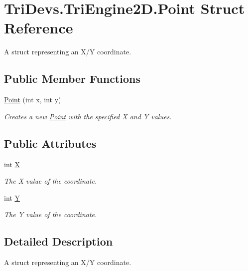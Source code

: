\hypertarget{struct_tri_devs_1_1_tri_engine2_d_1_1_point}{\section{Tri\-Devs.\-Tri\-Engine2\-D.\-Point Struct Reference}
\label{struct_tri_devs_1_1_tri_engine2_d_1_1_point}
}


A struct representing an X/\-Y coordinate.  


\subsection*{Public Member Functions}
\begin{DoxyCompactItemize}
\item 
\hyperlink{struct_tri_devs_1_1_tri_engine2_d_1_1_point_a3a3b2bb08d3698eb76adf458a465663a}{Point} (int x, int y)
\begin{DoxyCompactList}\small\item\em Creates a new \hyperlink{struct_tri_devs_1_1_tri_engine2_d_1_1_point}{Point} with the specified X and Y values. \end{DoxyCompactList}\end{DoxyCompactItemize}
\subsection*{Public Attributes}
\begin{DoxyCompactItemize}
\item 
int \hyperlink{struct_tri_devs_1_1_tri_engine2_d_1_1_point_a2dff6251e20a09f888596f31de981ffa}{X}
\begin{DoxyCompactList}\small\item\em The X value of the coordinate. \end{DoxyCompactList}\item 
int \hyperlink{struct_tri_devs_1_1_tri_engine2_d_1_1_point_ad750e91b0dbb5a69c3986abba3fbf964}{Y}
\begin{DoxyCompactList}\small\item\em The Y value of the coordinate. \end{DoxyCompactList}\end{DoxyCompactItemize}


\subsection{Detailed Description}
A struct representing an X/\-Y coordinate. 



